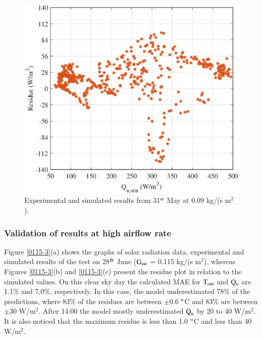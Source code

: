 \begin{figure}[ht!]
\begin{minipage}{0.39\columnwidth}
		\includegraphics[scale=0.5,width=1.0\columnwidth]{figs/009-residue-6.eps}
	\end{minipage}
	
	\caption{Experimental and simulated results from 31$^{\rm{st}}$ May at 0.09 kg/(s m$^2$).}
	\label{009-3}
\end{figure}


\subsubsection{Validation of results at high airflow rate}

Figure \ref{0115-3}(a) shows the graphs of solar radiation data, experimental and simulated results of the test on 28$^{\rm{th}}$ June ($\rm{G_{air}}$ = 0.115 kg/(s m$^2$), whereas Figures \ref{0115-3}(b) and \ref{0115-3}(c) present the residue plot in relation to the simulated values. On this clear sky day the calculated MAE for $\rm{T_{out}}$ and $\rm{Q_{u}}$ are 1.1\% and 7.0\%, respectively. In this case, the model underestimated 78\% of the predictions, where 83\% of the residues are between $\pm$0.6 $^{\rm{o}}$C and 83\% are between $\pm$30 W/m$^2$. After 14:00 the model mostly underestimated $\rm{Q_{u}}$ by 20 to 40 W/m$^2$. It is also noticed that the maximum residue is less than 1.0 $^{\rm{o}}$C and less than 40 W/m$^2$.

